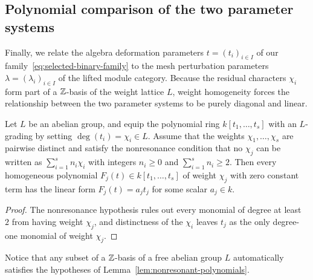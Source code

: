 \subsection{Polynomial comparison of the two parameter systems}

Finally, we relate the algebra deformation parameters $t=(t_i)_{i\in I}$ of our family~\eqref{eq:selected-binary-family} to the mesh perturbation parameters $\lambda=(\lambda_i)_{i\in I}$ of the lifted module category. Because the residual characters $\chi_i$ form part of a $\mathbb Z$-basis of the weight lattice $L$, weight homogeneity forces the relationship between the two parameter systems to be purely diagonal and linear.

\begin{lemma}
\label{lem:nonresonant-polynomials}
Let $L$ be an abelian group, and equip the polynomial ring $k[t_1,\ldots,t_s]$ with an $L$-grading by setting $\deg(t_i)=\chi_i\in L$. Assume that the weights $\chi_1,\ldots,\chi_s$ are pairwise distinct and satisfy the nonresonance condition that no $\chi_j$ can be written as $\sum_{i=1}^s n_i\chi_i$ with integers $n_i\geq0$ and $\sum_{i=1}^s n_i\geq2$. Then every homogeneous polynomial $F_j(t)\in k[t_1,\ldots,t_s]$ of weight $\chi_j$ with zero constant term has the linear form $F_j(t)=a_jt_j$ for some scalar $a_j\in k$.
\end{lemma}
\begin{proof}
The nonresonance hypothesis rules out every monomial of degree at least~$2$ from having weight $\chi_j$, and distinctness of the $\chi_i$ leaves $t_j$ as the only degree-one monomial of weight $\chi_j$.
\end{proof}

Notice that any subset of a $\mathbb Z$-basis of a free abelian group $L$ automatically satisfies the hypotheses of Lemma~\ref{lem:nonresonant-polynomials}.

